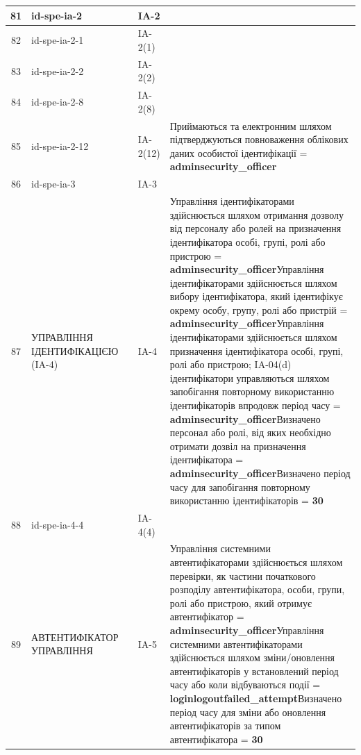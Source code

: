 \documentclass[10pt]{article}
\begin{document}
\begin{longtable}{|c|>{\raggedright\arraybackslash}p{2.5cm}|>{\raggedright\arraybackslash}p{4.5cm}|>{\raggedright\arraybackslash}p{3cm}|>{\raggedright\arraybackslash}p{4.5cm}|}
81 & id-spe-ia-2 &  & IA-2 &  \\ \hline
82 & id-spe-ia-2-1 &  & IA-2(1) &  \\ \hline
83 & id-spe-ia-2-2 &  & IA-2(2) &  \\ \hline
84 & id-spe-ia-2-8 &  & IA-2(8) &  \\ \hline
85 & id-spe-ia-2-12 &  & IA-2(12) & Приймаються та електронним шляхом підтверджуються повноваження облікових даних особистої ідентифікації = \textbf{adminsecurity\_\allowbreak{}officer} \\ \hline
86 & id-spe-ia-3 &  & IA-3 &  \\ \hline
87 & УПРАВЛІННЯ ІДЕНТИФІКАЦІЄЮ (IA-4) &  & IA-4 & Управління ідентифікаторами здійснюється шляхом отримання дозволу від персоналу або ролей на призначення ідентифікатора особі, групі, ролі або пристрою = \textbf{adminsecurity\_\allowbreak{}officer}\newline Управління ідентифікаторами здійснюється шляхом вибору ідентифікатора, який ідентифікує окрему особу, групу, ролі або пристрій = \textbf{adminsecurity\_\allowbreak{}officer}\newline Управління ідентифікаторами здійснюється шляхом призначення ідентифікатора особі, групі, ролі або пристрою; IA-04(d) ідентифікатори управляються шляхом запобігання повторному використанню ідентифікаторів впродовж період часу = \textbf{adminsecurity\_\allowbreak{}officer}\newline Визначено персонал або ролі, від яких необхідно отримати дозвіл на призначення ідентифікатора = \textbf{adminsecurity\_\allowbreak{}officer}\newline Визначено період часу для запобігання повторному використанню ідентифікаторів = \textbf{30} \\ \hline
88 & id-spe-ia-4-4 &  & IA-4(4) &  \\ \hline
89 & АВТЕНТИФІКАТОР УПРАВЛІННЯ &  & IA-5 & Управління системними автентифікаторами здійснюється шляхом перевірки, як частини початкового розподілу автентифікатора, особи, групи, ролі або пристрою, який отримує автентифікатор = \textbf{adminsecurity\_\allowbreak{}officer}\newline Управління системними автентифікаторами здійснюється шляхом зміни/оновлення автентифікаторів у встановлений період часу або коли відбуваються події = \textbf{loginlogoutfailed\_\allowbreak{}attempt}\newline Визначено період часу для зміни або оновлення автентифікаторів за типом автентифікатора = \textbf{30} \\ \hline

\end{longtable}
\end{document}
